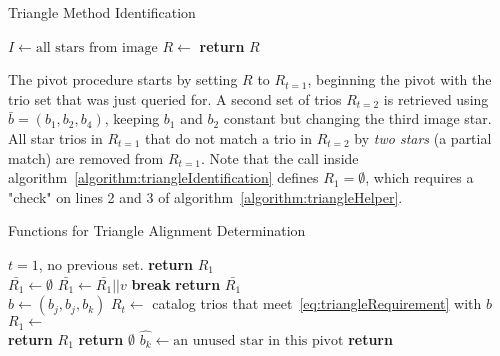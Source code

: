 \begin{algorithm}
    \caption{Triangle Method Identification} \label{algorithm:triangleIdentification}
    \begin{algorithmic}[1]
        \State $I \gets \text{all stars} \text{ from image}$
        \State $R \gets$ 
        \State \textbf{return} $R$
        \EndIf
        \EndFor
        \EndFor
        \EndFor
        \EndProcedure
    \end{algorithmic}
\end{algorithm}

The pivot procedure starts by setting $R$ to $R_{t=1}$, beginning the pivot with the trio set that was just queried
for. A second set of trios $R_{t=2}$ is retrieved using $\bar{b} = (b_1, b_2, b_4)$, keeping $b_1$ and $b_2$ constant
but changing the third image star. All star trios in $R_{t=1}$ that do not match a trio in $R_{t=2}$ by
\textit{two stars} (a partial match) are removed from $R_{t=1}$. Note that the  call
inside algorithm~\autoref{algorithm:triangleIdentification} defines $R_1 = \emptyset$, which requires a "check" on
lines 2 and 3 of algorithm~\autoref{algorithm:triangleHelper}.

\begin{algorithm}
    \caption{Functions for Triangle Alignment Determination} \label{algorithm:triangleHelper}
    \begin{algorithmic}[1]
         \Comment $t = 1$, no previous set.
        \State \textbf{return} $R_1$
        \EndIf
        \\
        \State $\bar{R_1} \gets \emptyset$
        \State $\bar{R_1} \gets \bar{R_1} || v$
        \State \textbf{break}
        \EndIf
        \EndFor
        \EndFor
        \State \textbf{return} $\bar{R_1}$
        \EndFunction
        \\
        \State $b \gets (b_j, b_j, b_k)$
        \State $R_t \gets $ catalog trios that meet~\eqref{eq:triangleRequirement} with $b$
        \State $R_1 \gets $ 
        \\
        \State \textbf{return} $R_1$
        \State \textbf{return} $\emptyset$
        \Else
        \State $\hat{b_k} \gets \text{an unused star in this pivot}$
        \State \textbf{return} 
        \EndIf
        \EndFunction
    \end{algorithmic}
\end{algorithm}

